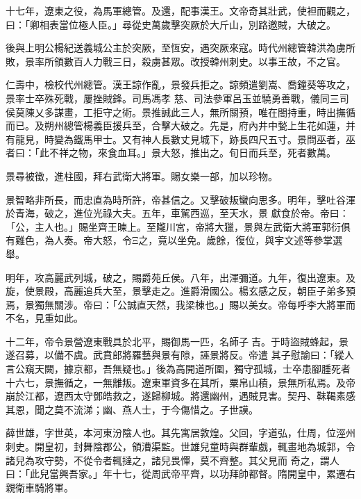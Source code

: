 \begin{pinyinscope}
 十七年，遼東之役，為馬軍總管。及還，配事漢王。文帝奇其壯武，使袒而觀之，曰：「卿相表當位極人臣。」尋從史萬歲擊突厥於大斤山，別路邀賊，大破之。



 後與上明公楊紀送義城公主於突厥，至恆安，遇突厥來寇。時代州總管韓洪為虜所敗，景率所領數百人力戰三日，殺虜甚眾。改授韓州刺史。以事王故，不之官。



 仁壽中，檢校代州總管。漢王諒作亂，景發兵拒之。諒頻遣劉嵩、喬鐘葵等攻之，景率士卒殊死戰，屢挫賊鋒。司馬馮孝
 慈、司法參軍呂玉並驍勇善戰，儀同三司侯莫陳乂多謀畫，工拒守之術。景推誠此三人，無所關預，唯在閤持重，時出撫循而已。及朔州總管楊義臣援兵至，合擊大破之。先是，府內井中甃上生花如蓮，并有龍見，時變為鐵馬甲士。又有神人長數丈見城下，跡長四尺五寸。景問巫者，巫者曰：「此不祥之物，來食血耳。」景大怒，推出之。旬日而兵至，死者數萬。



 景尋被徵，進柱國，拜右武衛大將軍。賜女樂一部，加以珍物。



 景智略非所長，而忠直為時所許，帝甚信之。又擊破叛蠻向思多。明年，擊吐谷渾於青海，破之，進位光祿大夫。五年，車駕西巡，至天水，景
 獻食於帝。帝曰：「公，主人也。」賜坐齊王暕上。至隴川宮，帝將大獵，景與左武衛大將軍郭衍俱有難色，為人奏。帝大怒，令Ξ之，竟以坐免。歲餘，復位，與宇文述等參掌選舉。



 明年，攻高麗武列城，破之，賜爵苑丘侯。八年，出渾彌道。九年，復出遼東。及旋，使景殿，高麗追兵大至，景擊走之。進爵滑國公。楊玄感之反，朝臣子弟多預焉，景獨無關涉。帝曰：「公誠直天然，我梁棟也。」賜以美女。帝每呼李大將軍而不名，見重如此。



 十二年，帝令景營遼東戰具於北平，賜御馬一匹，名師子吉。于時盜賊蜂起，景遂召募，以備不虞。武賁郎將羅藝與景有隙，誣景將反。帝遣
 其子慰諭曰：「縱人言公窺天闕，據京都，吾無疑也。」後為高開道所圍，獨守孤城，士卒患腳腫死者十六七，景撫循之，一無離叛。遼東軍資多在其所，粟帛山積，景無所私焉。及帝崩於江都，遼西太守鄧皓救之，遂歸柳城。將還幽州，遇賊見害。契丹、靺鞨素感其恩，聞之莫不流涕；幽、燕人士，于今傷惜之。子世謨。



 薛世雄，字世英，本河東汾陰人也。其先寓居敦煌。父回，字道弘，仕周，位涇州刺史。開皇初，封舞陰郡公，領漕渠監。世雄兒童時與群輩戲，輒畫地為城郭，令諸兒為攻守勢，不從令者輒撻之，諸兒畏憚，莫不齊整。其父見而
 奇之，謂人曰：「此兒當興吾家。」年十七，從周武帝平齊，以功拜帥都督。隋開皇中，累遷右親衛車騎將軍。




\end{pinyinscope}
